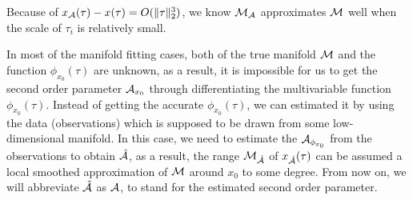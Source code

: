 \documentclass{article}
\theoremstyle{remark}
\begin{document}
Because of $x_{\cal A}(\tau)-x(\tau) = O(\|\tau\|_2^3)$, we know ${\cal M_A}$ approximates $\cal M$ well when the scale of  $\tau_i$ is relatively small.

In most of the manifold fitting cases, both of the true manifold $\cal M$ and the function $\phi_{x_0}(\tau)$ are unknown, as a result, it is impossible for us to get the second order parameter ${\cal A}_{x_0}$ through differentiating the multivariable function $\phi_{x_0}(\tau)$.
Instead of getting the accurate $\phi_{x_0}(\tau)$, we can estimated it by using the data (observations) which is supposed to be drawn from some low-dimensional manifold. In this case, we need to estimate the ${\cal A}_{\phi_{x_0}}$ from the observations to obtain $\hat{\cal A}$, as a result, the range $\cal M_{\hat{\cal A}}$ of $x_{\hat{\cal A}}(\tau)$ can be assumed a local smoothed approximation of $\cal M$ around $x_0$ to some degree.
From now on, we will abbreviate $\hat{\cal A}$ as ${\cal A}$, to stand for the estimated second order parameter.
\end{document}
